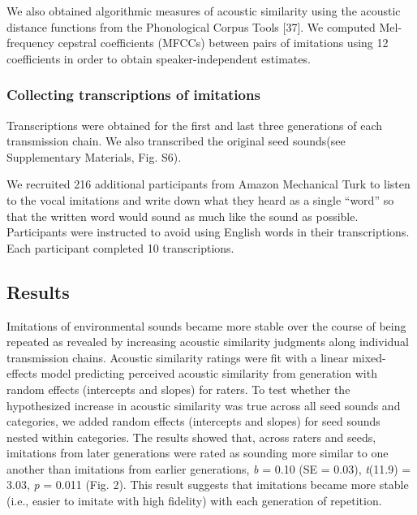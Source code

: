 \documentclass[english,floatsintext,man]{apa6}
\theoremstyle{definition}
\theoremstyle{definition}
\theoremstyle{definition}
\theoremstyle{remark}
\begin{document}
We also obtained algorithmic measures of acoustic similarity using the
acoustic distance functions from the Phonological Corpus Tools {[}37{]}.
We computed Mel-frequency cepstral coefficients (MFCCs) between pairs of
imitations using 12 coefficients in order to obtain speaker-independent
estimates.

\hypertarget{collecting-transcriptions-of-imitations}{%
\subsubsection{Collecting transcriptions of
imitations}\label{collecting-transcriptions-of-imitations}}

Transcriptions were obtained for the first and last three generations of
each transmission chain. We also transcribed the original seed
sounds(see Supplementary Materials, Fig. S6).

We recruited 216 additional participants from Amazon Mechanical Turk to
listen to the vocal imitations and write down what they heard as a
single \enquote{word} so that the written word would sound as much like
the sound as possible. Participants were instructed to avoid using
English words in their transcriptions. Each participant completed 10
transcriptions.

\hypertarget{results}{%
\subsection{Results}\label{results}}

Imitations of environmental sounds became more stable over the course of
being repeated as revealed by increasing acoustic similarity judgments
along individual transmission chains. Acoustic similarity ratings were
fit with a linear mixed-effects model predicting perceived acoustic
similarity from generation with random effects (intercepts and slopes)
for raters. To test whether the hypothesized increase in acoustic
similarity was true across all seed sounds and categories, we added
random effects (intercepts and slopes) for seed sounds nested within
categories. The results showed that, across raters and seeds, imitations
from later generations were rated as sounding more similar to one
another than imitations from earlier generations, \emph{b} = 0.10 (SE =
0.03), \emph{t}(11.9) = 3.03, \emph{p} = 0.011 (Fig. 2). This result
suggests that imitations became more stable (i.e., easier to imitate
with high fidelity) with each generation of repetition.
\end{document}
